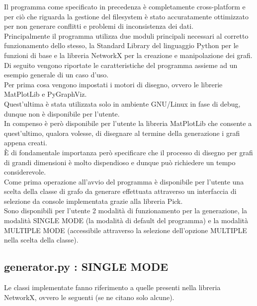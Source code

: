 Il programma come specificato in precedenza è completamente cross-platform e per ciò che riguarda la gestione del filesystem è stato accuratamente ottimizzato per non generare conflitti e problemi di inconsistenza dei dati.\\

Principalmente il programma utilizza due moduli principali necessari al corretto funzionamento dello stesso, la Standard Library del linguaggio Python per le funzioni di base e la libreria NetworkX per la creazione e manipolazione dei grafi.\\

Di seguito vengono riportate le caratteristiche del programma assieme ad un esempio generale di un caso d'uso.\\

Per prima cosa vengono impostati i motori di disegno, ovvero le librerie MatPlotLib e PyGraphViz.\\
Quest'ultima è stata utilizzata solo in ambiente GNU/Linux in fase di debug, dunque non è disponibile per l'utente.\\

In compenso è però disponibile per l'utente la libreria MatPlotLib che consente a quest'ultimo, qualora volesse, di disegnare al termine della generazione i grafi appena creati.\\
È di fondamentale importanza però specificare che il processo di disegno per grafi di grandi dimensioni è molto dispendioso e dunque può richiedere un tempo considerevole.\\

Come prima operazione all'avvio del programma è disponibile per l'utente una scelta della classe di grafo da generare effettuata attraverso un interfaccia di selezione da console implementata grazie alla libreria Pick.\\

Sono disponibili per l'utente 2 modalità di funzionamento per la generazione, la modalità SINGLE MODE (la modalità di default del programma) e la modalità MULTIPLE MODE (accessibile attraverso la selezione dell'opzione MULTIPLE nella scelta della classe).\\

\subsection{generator.py : SINGLE MODE}
\justify
Le classi implementate fanno riferimento a quelle presenti nella libreria NetworkX, ovvero le seguenti (se ne citano solo alcune).

